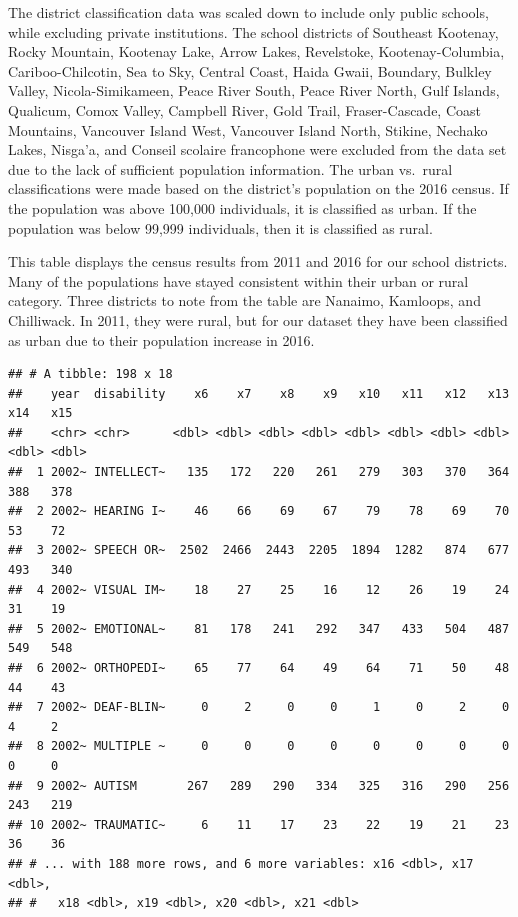 \documentclass[
  english,
  man]{apa6}
\begin{document}
The district classification data was scaled down to include only public schools, while excluding private institutions. The school districts of Southeast Kootenay, Rocky Mountain, Kootenay Lake, Arrow Lakes, Revelstoke, Kootenay-Columbia, Cariboo-Chilcotin, Sea to Sky, Central Coast, Haida Gwaii, Boundary, Bulkley Valley, Nicola-Simikameen, Peace River South, Peace River North, Gulf Islands, Qualicum, Comox Valley, Campbell River, Gold Trail, Fraser-Cascade, Coast Mountains, Vancouver Island West, Vancouver Island North, Stikine, Nechako Lakes, Nisga'a, and Conseil scolaire francophone were excluded from the data set due to the lack of sufficient population information. The urban vs.~rural classifications were made based on the district's population on the 2016 census. If the population was above 100,000 individuals, it is classified as urban. If the population was below 99,999 individuals, then it is classified as rural.

This table displays the census results from 2011 and 2016 for our school districts. Many of the populations have stayed consistent within their urban or rural category. Three districts to note from the table are Nanaimo, Kamloops, and Chilliwack. In 2011, they were rural, but for our dataset they have been classified as urban due to their population increase in 2016.

\begin{verbatim}
## # A tibble: 198 x 18
##    year  disability    x6    x7    x8    x9   x10   x11   x12   x13   x14   x15
##    <chr> <chr>      <dbl> <dbl> <dbl> <dbl> <dbl> <dbl> <dbl> <dbl> <dbl> <dbl>
##  1 2002~ INTELLECT~   135   172   220   261   279   303   370   364   388   378
##  2 2002~ HEARING I~    46    66    69    67    79    78    69    70    53    72
##  3 2002~ SPEECH OR~  2502  2466  2443  2205  1894  1282   874   677   493   340
##  4 2002~ VISUAL IM~    18    27    25    16    12    26    19    24    31    19
##  5 2002~ EMOTIONAL~    81   178   241   292   347   433   504   487   549   548
##  6 2002~ ORTHOPEDI~    65    77    64    49    64    71    50    48    44    43
##  7 2002~ DEAF-BLIN~     0     2     0     0     1     0     2     0     4     2
##  8 2002~ MULTIPLE ~     0     0     0     0     0     0     0     0     0     0
##  9 2002~ AUTISM       267   289   290   334   325   316   290   256   243   219
## 10 2002~ TRAUMATIC~     6    11    17    23    22    19    21    23    36    36
## # ... with 188 more rows, and 6 more variables: x16 <dbl>, x17 <dbl>,
## #   x18 <dbl>, x19 <dbl>, x20 <dbl>, x21 <dbl>
\end{verbatim}
\end{document}
